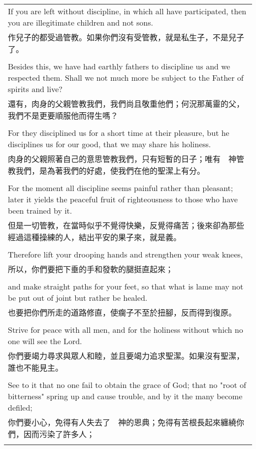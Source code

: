 \begin{tabularx}{\textwidth}{p{}}
If you are left without discipline, in which all have participated, then you are illegitimate children and not sons. \\
作兒子的都受過管教。如果你們沒有受管教，就是私生子，不是兒子了。 \\ \\
Besides this, we have had earthly fathers to discipline us and we respected them. Shall we not much more be subject to the Father of spirits and live? \\
還有，肉身的父親管教我們，我們尚且敬重他們；何況那萬靈的父，我們不是更要順服他而得生嗎？ \\ \\
For they disciplined us for a short time at their pleasure, but he disciplines us for our good, that we may share his holiness. \\
肉身的父親照著自己的意思管教我們，只有短暫的日子；唯有　神管教我們，是為著我們的好處，使我們在他的聖潔上有分。 \\ \\
For the moment all discipline seems painful rather than pleasant; later it yields the peaceful fruit of righteousness to those who have been trained by it. \\
但是一切管教，在當時似乎不覺得快樂，反覺得痛苦；後來卻為那些經過這種操練的人，結出平安的果子來，就是義。 \\ \\
Therefore lift your drooping hands and strengthen your weak knees, \\
所以，你們要把下垂的手和發軟的腿挺直起來； \\ \\
and make straight paths for your feet, so that what is lame may not be put out of joint but rather be healed. \\
也要把你們所走的道路修直，使瘸子不至於扭腳，反而得到復原。 \\ \\
Strive for peace with all men, and for the holiness without which no one will see the Lord. \\
你們要竭力尋求與眾人和睦，並且要竭力追求聖潔。如果沒有聖潔，誰也不能見主。 \\ \\
See to it that no one fail to obtain the grace of God; that no "root of bitterness" spring up and cause trouble, and by it the many become defiled; \\
你們要小心，免得有人失去了　神的恩典；免得有苦根長起來纏繞你們，因而污染了許多人； \\ \\

\end{tabularx}
